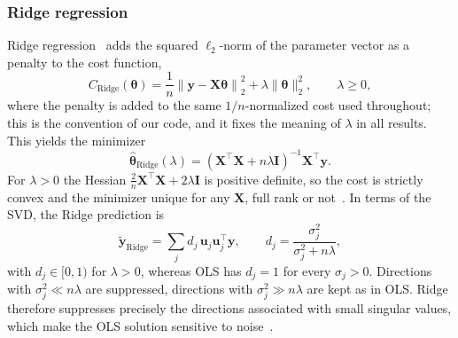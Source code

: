 \subsubsection{Ridge regression}
Ridge regression~\cite{hoerl_1970} adds the squared $\ell_2$-norm of the
parameter vector as a penalty to the cost function,
\begin{equation}\label{eq:ridge_cost}
    C_\text{Ridge}(\bm{\theta}) = \frac{1}{n}\left\lVert \bm{y}
    - \bm{X}\bm{\theta} \right\rVert_2^2 + \lambda \lVert \bm{\theta} \rVert_2^2,
    \qquad \lambda \geq 0,
\end{equation}
where the penalty is added to the same $1/n$-normalized cost used throughout;
this is the convention of our code, and it fixes the meaning of $\lambda$ in
all results. This yields the minimizer
\begin{equation}\label{eq:ridge-theta-hat}
    \hat{\bm{\theta}}_{\text{Ridge}}(\lambda) = \left(\bm{X}^\top \bm{X}
    + n\lambda \bm{I}\right)^{-1} \bm{X}^\top \bm{y}.
\end{equation}
For $\lambda > 0$ the Hessian $\frac{2}{n}\bm{X}^\top\bm{X} + 2\lambda\bm{I}$
is positive definite, so the cost is strictly convex and the minimizer unique
for any $\bm{X}$, full rank or not~\cite{hjorth-jensen_2026}. In terms of the SVD, the Ridge prediction is
\begin{equation}
    \tilde{\bm{y}}_{\text{Ridge}} = \sum_{j} d_j\, \bm{u}_j \bm{u}_j^\top \bm{y},
    \qquad
    d_j = \frac{\sigma_j^2}{\sigma_j^2 + n\lambda},
    \label{eq:ridge_scaling}
\end{equation}
with $d_j\in[0,1)$ for $\lambda>0$, whereas OLS has $d_j = 1$ for every $\sigma_j > 0$.
Directions with $\sigma_j^2 \ll n\lambda$ are suppressed, directions with
$\sigma_j^2 \gg n\lambda$ are kept as in OLS. Ridge therefore suppresses precisely
the directions associated with small singular values, which make the OLS solution
sensitive to noise~\cite{hjorth-jensen_2026}.


